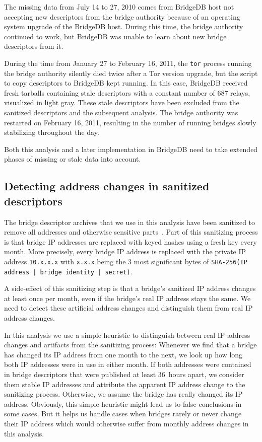 \documentclass{article}
\begin{document}
The missing data from July 14 to 27, 2010 comes from BridgeDB host not
accepting new descriptors from the bridge authority because of an
operating system upgrade of the BridgeDB host.
During this time, the bridge authority continued to work, but BridgeDB was
unable to learn about new bridge descriptors from it.

During the time from January 27 to February 16, 2011, the \verb+tor+
process running the bridge authority silently died twice after a Tor
version upgrade, but the script to copy descriptors to BridgeDB kept
running.
In this case, BridgeDB received fresh tarballs containing stale
descriptors with a constant number of 687 relays, visualized in light
gray.
These stale descriptors have been excluded from the sanitized descriptors
and the subsequent analysis.
The bridge authority was restarted on February 16, 2011, resulting in the
number of running bridges slowly stabilizing throughout the day.

Both this analysis and a later implementation in BridgeDB need to take
extended phases of missing or stale data into account.

\subsection{Detecting address changes in sanitized descriptors}
\label{sec:sanitizing}

The bridge descriptor archives that we use in this analysis have been
sanitized to remove all addresses and otherwise sensitive
parts~\cite{loesing2011overview}.
Part of this sanitizing process is that bridge IP addresses are replaced
with keyed hashes using a fresh key every month.
More precisely, every bridge IP address is replaced with the private IP
address \verb+10.x.x.x+ with \verb+x.x.x+ being the 3 most significant
bytes of \verb+SHA-256(IP address | bridge identity | secret)+.

A side-effect of this sanitizing step is that a bridge's sanitized IP
address changes at least once per month, even if the bridge's real IP
address stays the same.
We need to detect these artificial address changes and distinguish them
from real IP address changes.

In this analysis we use a simple heuristic to distinguish between real IP
address changes and artifacts from the sanitizing process:
Whenever we find that a bridge has changed its IP address from one month
to the next, we look up how long both IP addresses were in use in either
month.
If both addresses were contained in bridge descriptors that were published
at least 36~hours apart, we consider them stable IP addresses and
attribute the apparent IP address change to the sanitizing process.
Otherwise, we assume the bridge has really changed its IP address.
Obviously, this simple heuristic might lead us to false conclusions in
some cases.
But it helps us handle cases when bridges rarely or never change their IP
address which would otherwise suffer from monthly address changes in this
analysis.
\end{document}
